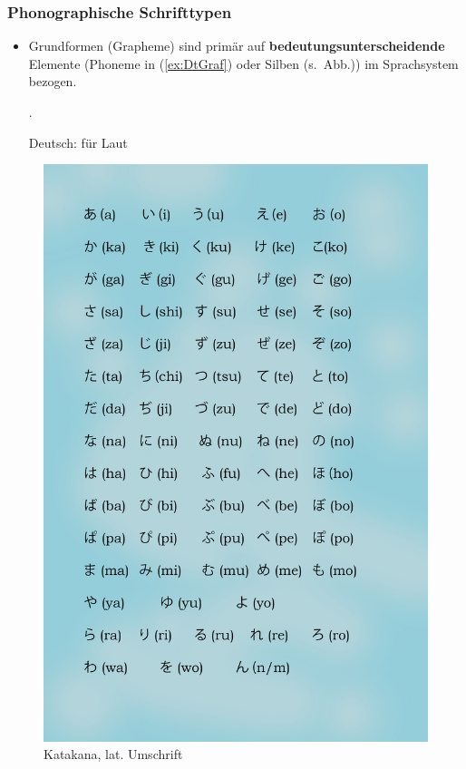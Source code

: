 \begin{frame}
\frametitle{Phonographische Schrifttypen}

\begin{minipage}{.59\textwidth}

\begin{itemize}
	\item Grundformen (\zB Grapheme) sind primär auf \textbf{bedeutungsunterscheidende} Elemente (\zB Phoneme in (\ref{ex:DtGraf}) oder Silben (s.\ Abb.)) im Sprachsystem bezogen.
	
	 \citep[vgl.][76--77]{Duerscheid04a}.
	
	\ea\label{ex:DtGraf} Deutsch:  für Laut \textipa{[k]}
	\z 
\end{itemize}

\end{minipage}\hfill%
\begin{minipage}{.4\textwidth}
\begin{figure}
	\centering
	
	\includegraphics[scale=.057]{material/05Katakana}
	\caption{Katakana, lat. Umschrift}
	\label{Katakana}
\end{figure}
\end{minipage}

\end{frame}


